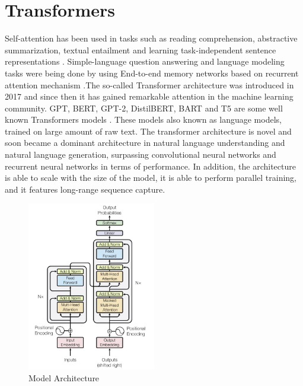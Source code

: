 \section{Transformers}

Self-attention has been used in tasks such as reading comprehension, abstractive summarization, textual entailment and learning task-independent sentence representations \cite{cheng2016longshorttermmemory, parikh2016decomposable, paulus2017deep, lin2017structured}. Simple-language question answering and language modeling tasks were being done by using End-to-end memory networks based on recurrent attention mechanism \cite{sukhbaatar2015end}.The so-called Transformer architecture was introduced in 2017 \cite{vaswani2017attention} and since then it has gained remarkable attention in the machine learning community. GPT, BERT, GPT-2, DistilBERT, BART and T5 are some well known Transformers models \cite{radford2018improving, devlin2018bert, GPT_2, DistilBERT, T5}. These models also known as language models, trained on large amount of raw text. The transformer architecture is novel and soon became a dominant architecture in natural language understanding and natural language generation, surpassing convolutional neural networks and recurrent neural networks in terms of performance. In addition, the architecture is able to scale with the size of the model, it is able to perform parallel training, and it features long-range sequence capture.

\begin{figure}[ht]
    \centering
    \includegraphics[width=0.5\textwidth]{chapters/images/Transformer/Architecture.JPG}
    \caption{Model Architecture\cite{vaswani2017attention}}
    \label{fig:Model_Architecture}
\end{figure}

